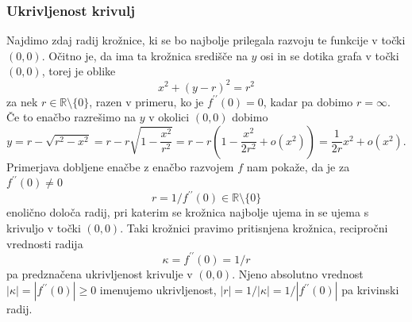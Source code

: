 \documentclass[8pt]{beamer}
\theoremstyle{definition}
\theoremstyle{remark}
\theoremstyle{plain}
\numberwithin{equation}{section}  %
\begin{document}
\begin{frame}
    \frametitle{Ukrivljenost krivulj}

    Najdimo zdaj radij krožnice, ki se bo najbolje prilegala razvoju te funkcije v točki $(0,0)$. Očitno je, da ima ta krožnica središče na $y$ osi in se dotika grafa v točki $(0,0)$, torej je oblike
    \begin{equation*}
        x^2+(y-r)^2=r^2
    \end{equation*}
    za nek $r \in \mathbb{R} \setminus \{0\}$, razen v primeru, ko je $f^{\prime \prime}(0)=0$, kadar pa dobimo $r=\infty$. Če to enačbo razrešimo na $y$ v okolici $(0,0)$ dobimo 
    \begin{equation*}
        y=r-\sqrt{r^2-x^2}=r-r \sqrt{1-\frac{x^2}{r^2}}=r-r\left(1-\frac{x^2}{2 r^2}+o\left(x^2\right)\right)=\frac{1}{2 r} x^2+o\left(x^2\right).
    \end{equation*}
    Primerjava dobljene enačbe z enačbo razvojem $f$ nam pokaže, da je za $f^{\prime \prime}(0)\neq0$ 
    \begin{equation*}
        r=1 / f^{\prime \prime}(0) \in \mathbb{R} \setminus \{0\}
    \end{equation*}
    enolično določa radij, pri katerim se krožnica najbolje ujema in se ujema s krivuljo v točki $(0,0)$. Taki krožnici pravimo \textcolor{red1}{pritisnjena krožnica}, recipročni vrednosti radija 
    \begin{equation*}
        \kappa=f^{\prime \prime}(0)=1 / r
    \end{equation*}
    pa \textcolor{red1}{predznačena ukrivljenost} krivulje v $(0,0)$. Njeno absolutno vrednost $|\kappa|=\left|f^{\prime \prime}(0)\right| \geq 0$ imenujemo \textcolor{red1}{ukrivljenost}, $|r|=1 /|\kappa|=1 /\left|f^{\prime \prime}(0)\right|$ pa \textcolor{red1}{krivinski radij}. 

\end{frame}
\end{document}
